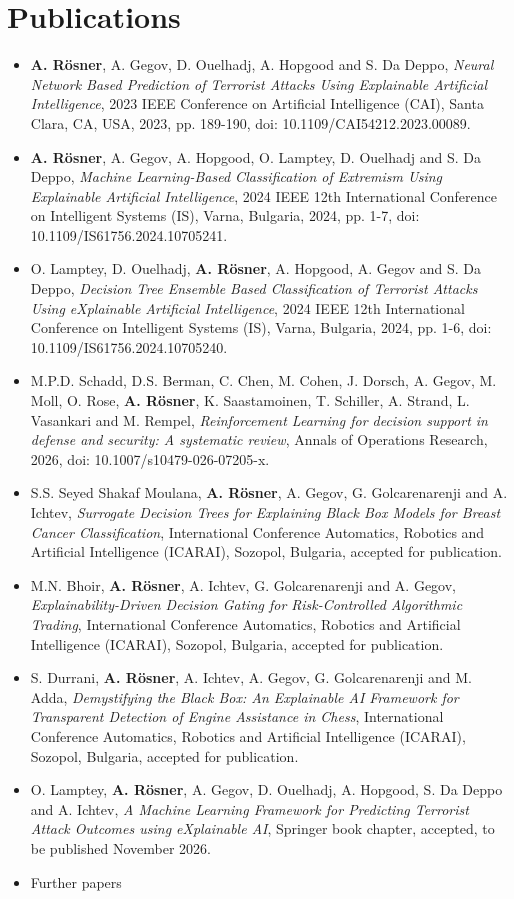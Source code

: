 \chapter*{Publications}

\begin{itemize}
   \item {\textbf{A. Rösner}}, A. Gegov, D. Ouelhadj, A. Hopgood and S. Da Deppo, \textit{Neural Network Based Prediction of Terrorist Attacks Using Explainable Artificial Intelligence}, 2023 IEEE Conference on Artificial Intelligence (CAI), Santa Clara, CA, USA, 2023, pp. 189-190, doi: 10.1109/CAI54212.2023.00089.
   \item {\textbf{A. Rösner}}, A. Gegov, A. Hopgood, O. Lamptey, D. Ouelhadj and S. Da Deppo, \textit{Machine Learning-Based Classification of Extremism Using Explainable Artificial Intelligence}, 2024 IEEE 12th International Conference on Intelligent Systems (IS), Varna, Bulgaria, 2024, pp. 1-7, doi: 10.1109/IS61756.2024.10705241.
   \item O. Lamptey, D. Ouelhadj, {\textbf{A. Rösner}}, A. Hopgood, A. Gegov and S. Da Deppo, \textit{Decision Tree Ensemble Based Classification of Terrorist Attacks Using eXplainable Artificial Intelligence}, 2024 IEEE 12th International Conference on Intelligent Systems (IS), Varna, Bulgaria, 2024, pp. 1-6, doi: 10.1109/IS61756.2024.10705240.
   \item M.P.D. Schadd, D.S. Berman, C. Chen, M. Cohen, J. Dorsch, A. Gegov, M. Moll, O. Rose, {\textbf{A. Rösner}}, K. Saastamoinen, T. Schiller, A. Strand, L. Vasankari and M. Rempel, \textit{Reinforcement Learning for decision support in defense and security: A systematic review}, Annals of Operations Research, 2026, doi: 10.1007/s10479-026-07205-x.
   \item S.S. Seyed Shakaf Moulana, {\textbf{A. Rösner}}, A. Gegov, G. Golcarenarenji and A. Ichtev, \textit{Surrogate Decision Trees for Explaining Black Box Models for Breast Cancer Classification}, International Conference Automatics, Robotics and Artificial Intelligence (ICARAI), Sozopol, Bulgaria, accepted for publication.
   \item M.N. Bhoir, {\textbf{A. Rösner}}, A. Ichtev, G. Golcarenarenji and A. Gegov, \textit{Explainability-Driven Decision Gating for Risk-Controlled Algorithmic Trading}, International Conference Automatics, Robotics and Artificial Intelligence (ICARAI), Sozopol, Bulgaria, accepted for publication.
   \item S. Durrani, {\textbf{A. Rösner}}, A. Ichtev, A. Gegov, G. Golcarenarenji and M. Adda, \textit{Demystifying the Black Box: An Explainable AI Framework for Transparent Detection of Engine Assistance in Chess}, International Conference Automatics, Robotics and Artificial Intelligence (ICARAI), Sozopol, Bulgaria, accepted for publication.
   \item O. Lamptey, {\textbf{A. Rösner}}, A. Gegov, D. Ouelhadj, A. Hopgood, S. Da Deppo and A. Ichtev, \textit{A Machine Learning Framework for Predicting Terrorist Attack Outcomes using eXplainable AI}, Springer book chapter, accepted, to be published November 2026.
   \item Further papers
\end{itemize}


